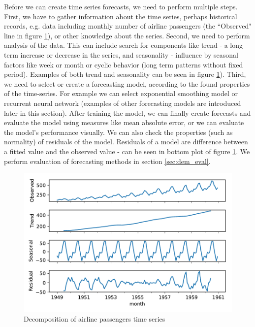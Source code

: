 \documentclass[11pt,a4paper]{article}
\begin{document}
Before we can create time series forecasts, we need to perform multiple steps. First, we have to gather information about the time series, perhaps historical records, e.g. data including monthly number of airline passengers (the ``Observed" line in figure \ref{fig:passengers}), or other knowledge about the series. Second, we need to perform analysis of the data. This can include search for components like trend - a long term increase or decrease in the series, and seasonality - influence by seasonal factors like week or month or cyclic behavior (long term patterns without fixed period). Examples of both trend and seasonality can be seen in figure \ref{fig:passengers}).
Third, we need to select or create a forecasting model, according to the found properties of the time-series. For example we can select exponential smoothing model or recurrent neural network (examples of other forecasting models are introduced later in this section). After training the model, we can finally create forecasts and evaluate the model using measures like mean absolute error, or we can evaluate the model's performance visually. We can also check the properties (such as normality) of residuals of the model. Residuals of a model are difference between a fitted value and the observed value - can be seen in bottom plot of figure \ref{fig:passengers}. We perform evaluation of forecasting methods in section \ref{sec:dem_eval}. 
\begin{figure}
  \includegraphics[width=\linewidth]{figures/passengers.pdf}
  \caption{Decomposition of airline passengers time series}
  \label{fig:passengers}
\end{figure}
\end{document}
